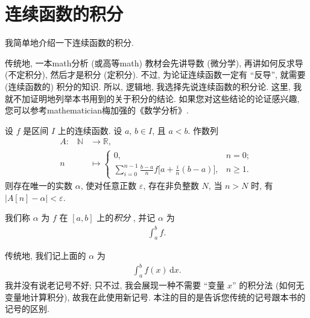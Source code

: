 \section{连续函数的积分}

我简单地介绍一下连续函数的积分.

传统地,
一本\gls{math}分析 (或高等\gls{math}) 教材会先讲导数 (微分学),
再讲如何反求导 (不定积分),
然后才是积分 (定积分).
不过, 为论证连续函数一定有 ``反导'',
就需要 (连续函数的) 积分的知识.
所以, 逻辑地, 我选择先说连续函数的积分论.
这里, 我就不加证明地列举本书用到的关于积分的结论.
如果您对这些结论的论证感兴趣,
您可以参考\gls{mathematician}梅加强的《数学分析》.

\begin{theorem}
    设 $f$ 是区间 $I$ 上的连续函数.
    设 $a$, $b \in I$, 且 $a < b$.
    作数列
    \begin{align*}
        \text{$A$:} \quad
        \mathbb{N} & \to \mathbb{R},                                                                                                        \\
        n          & \mapsto \begin{cases}
                                 0,                                                                                             & n = 0;    \\
                                 {\displaystyle \sum_{i = 0}^{n - 1} {\frac{b - a}{n} f\bigg[ a + \frac{i}{n} (b - a) \bigg]}}, & n \geq 1.
                             \end{cases}
    \end{align*}
    则存在唯一的实数 $\alpha$,
    使对任意正数 $\varepsilon$,
    存在非负整数 $N$,
    当 $n > N$ 时, 有
    $|A[n] - \alpha| < \varepsilon$.

    我们称 $\alpha$ 为 $f$ 在 $[a, b]$ 上的\emph{积分}%
    ,
    并记 $\alpha$ 为
    \begin{align*}
        \int_{a}^{b} {f}.
    \end{align*}
\end{theorem}

\begin{remark}
    传统地, 我们记上面的 $\alpha$ 为
    \begin{align*}
        \int_{a}^{b} {f(x) \,\mathrm{d}x}.
    \end{align*}
    我并没有说老记号不好;
    只不过, 我会展现一种不需要 ``变量 $x$'' 的积分法
    (如何无变量地计算积分),
    故我在此使用新记号.
    本注的目的是告诉您传统的记号跟本书的记号的区别.
\end{remark}

